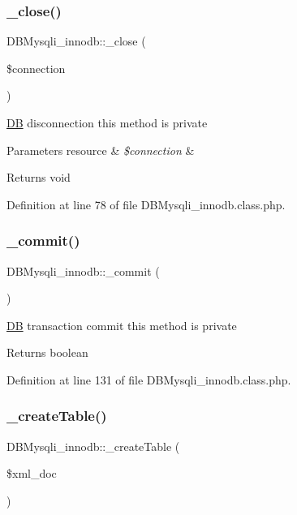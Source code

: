 \subsubsection{\texorpdfstring{\+\_\+close()}{\_close()}}
{\footnotesize\ttfamily D\+B\+Mysqli\+\_\+innodb\+::\+\_\+close (\begin{DoxyParamCaption}\item[{}]{\$connection }\end{DoxyParamCaption})}

\hyperlink{classDB}{DB} disconnection this method is private 
\begin{DoxyParams}[1]{Parameters}
resource & {\em \$connection} & \\
\hline
\end{DoxyParams}
\begin{DoxyReturn}{Returns}
void 
\end{DoxyReturn}


Definition at line 78 of file D\+B\+Mysqli\+\_\+innodb.\+class.\+php.

\mbox{\label{classDBMysqli__innodb_a0ec5faa054822bd226fa6c404b17e674}} 
\subsubsection{\texorpdfstring{\+\_\+commit()}{\_commit()}}
{\footnotesize\ttfamily D\+B\+Mysqli\+\_\+innodb\+::\+\_\+commit (\begin{DoxyParamCaption}{ }\end{DoxyParamCaption})}

\hyperlink{classDB}{DB} transaction commit this method is private \begin{DoxyReturn}{Returns}
boolean 
\end{DoxyReturn}


Definition at line 131 of file D\+B\+Mysqli\+\_\+innodb.\+class.\+php.

\mbox{\label{classDBMysqli__innodb_adea880ad43bc281fbdae806bd25d6cce}} 
\subsubsection{\texorpdfstring{\+\_\+create\+Table()}{\_createTable()}}
{\footnotesize\ttfamily D\+B\+Mysqli\+\_\+innodb\+::\+\_\+create\+Table (\begin{DoxyParamCaption}\item[{}]{\$xml\+\_\+doc }\end{DoxyParamCaption})}

